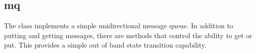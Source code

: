 %
%
%
%
%              

\subsection{mq}
\label{mq}

The  class implements a simple unidirectional message queue.
In addition to putting and getting messages, there are methods that control
the ability to get or put.  This provides a simple out of band state
transition capability.

